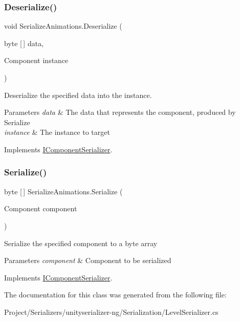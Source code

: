 \subsubsection{\texorpdfstring{Deserialize()}{Deserialize()}}
{\footnotesize\ttfamily void Serialize\+Animations.\+Deserialize (\begin{DoxyParamCaption}\item[{byte \mbox{[}$\,$\mbox{]}}]{data,  }\item[{Component}]{instance }\end{DoxyParamCaption})\hspace{0.3cm}{\ttfamily [inline]}}



Deserialize the specified data into the instance. 


\begin{DoxyParams}{Parameters}
{\em data} & The data that represents the component, produced by Serialize \\
\hline
{\em instance} & The instance to target \\
\hline
\end{DoxyParams}


Implements \hyperlink{interface_i_component_serializer_a4cc366a5c78b33d47a90c209d8fed883}{I\+Component\+Serializer}.

\mbox{\label{class_serialize_animations_a05552bb8c8baad409516f661845bc4e7}} 
\subsubsection{\texorpdfstring{Serialize()}{Serialize()}}
{\footnotesize\ttfamily byte \mbox{[}$\,$\mbox{]} Serialize\+Animations.\+Serialize (\begin{DoxyParamCaption}\item[{Component}]{component }\end{DoxyParamCaption})\hspace{0.3cm}{\ttfamily [inline]}}



Serialize the specified component to a byte array 


\begin{DoxyParams}{Parameters}
{\em component} & Component to be serialized \\
\hline
\end{DoxyParams}


Implements \hyperlink{interface_i_component_serializer_ab2aa38005665496b62d6c54b5f0dbd31}{I\+Component\+Serializer}.



The documentation for this class was generated from the following file\+:\begin{DoxyCompactItemize}
\item 
Project/\+Serializers/unityserializer-\/ng/\+Serialization/Level\+Serializer.\+cs\end{DoxyCompactItemize}
